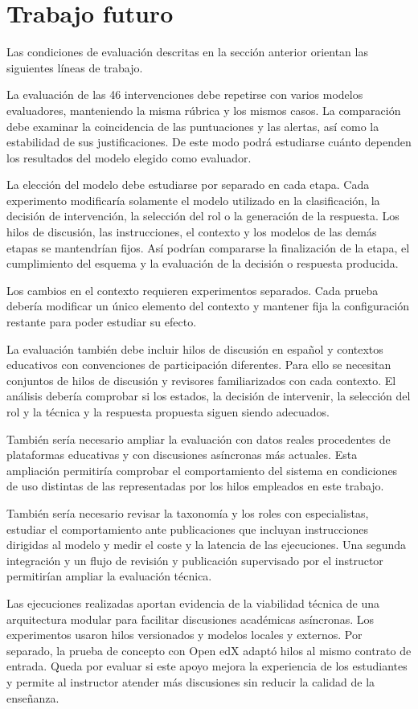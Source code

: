 \section{Trabajo futuro}

Las condiciones de evaluación descritas en la sección anterior orientan las siguientes líneas de trabajo.

La evaluación de las 46 intervenciones debe repetirse con varios modelos evaluadores, manteniendo la misma rúbrica y los mismos casos. La comparación debe examinar la coincidencia de las puntuaciones y las alertas, así como la estabilidad de sus justificaciones. De este modo podrá estudiarse cuánto dependen los resultados del modelo elegido como evaluador.

La elección del modelo debe estudiarse por separado en cada etapa. Cada experimento modificaría solamente el modelo utilizado en la clasificación, la decisión de intervención, la selección del rol o la generación de la respuesta. Los hilos de discusión, las instrucciones, el contexto y los modelos de las demás etapas se mantendrían fijos. Así podrían compararse la finalización de la etapa, el cumplimiento del esquema y la evaluación de la decisión o respuesta producida.

Los cambios en el contexto requieren experimentos separados. Cada prueba debería modificar un único elemento del contexto y mantener fija la configuración restante para poder estudiar su efecto.

La evaluación también debe incluir hilos de discusión en español y contextos educativos con convenciones de participación diferentes. Para ello se necesitan conjuntos de hilos de discusión y revisores familiarizados con cada contexto. El análisis debería comprobar si los estados, la decisión de intervenir, la selección del rol y la técnica y la respuesta propuesta siguen siendo adecuados.

También sería necesario ampliar la evaluación con datos reales procedentes de plataformas educativas y con discusiones asíncronas más actuales. Esta ampliación permitiría comprobar el comportamiento del sistema en condiciones de uso distintas de las representadas por los hilos empleados en este trabajo.

También sería necesario revisar la taxonomía y los roles con especialistas, estudiar el comportamiento ante publicaciones que incluyan instrucciones dirigidas al modelo y medir el coste y la latencia de las ejecuciones. Una segunda integración y un flujo de revisión y publicación supervisado por el instructor permitirían ampliar la evaluación técnica.

Las ejecuciones realizadas aportan evidencia de la viabilidad técnica de una arquitectura modular para facilitar discusiones académicas asíncronas. Los experimentos usaron hilos versionados y modelos locales y externos. Por separado, la prueba de concepto con Open edX adaptó hilos al mismo contrato de entrada. Queda por evaluar si este apoyo mejora la experiencia de los estudiantes y permite al instructor atender más discusiones sin reducir la calidad de la enseñanza.
